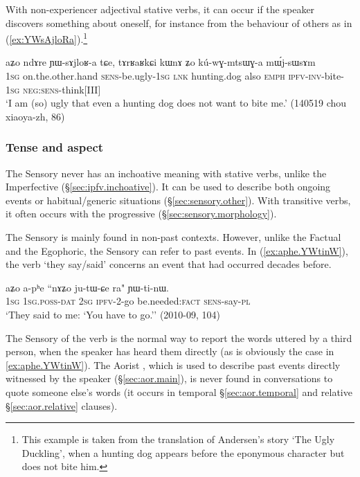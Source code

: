 With non-experiencer adjectival stative verbs, it can occur if the speaker discovers something about oneself, for instance from the behaviour of others as in (\ref{ex:YWsAjloRa}).\footnote{This example is taken from the translation of Andersen's story `The Ugly Duckling', when a hunting dog appears before the eponymous character but does not bite him. }

\begin{exe}
\ex \label{ex:YWsAjloRa}
\gll  aʑo ndɤre ɲɯ-sɤjloʁ-a tɕe, tɤrʁaʁkɕi kɯnɤ ʑo kú-wɣ-mtsɯɣ-a mɯ́j-sɯsɤm \\
\textsc{1sg} on.the.other.hand \textsc{sens}-be.ugly-\textsc{1sg} \textsc{lnk} hunting.dog also \textsc{emph} \textsc{ipfv}-\textsc{inv}-bite-\textsc{1sg} \textsc{neg}:\textsc{sens}-think[III] \\
\glt `I am (so) ugly that even a hunting dog does not want to bite me.'  (140519 chou xiaoya-zh, 86)
\end{exe}

 
\subsubsection{Tense and aspect} \label{sec:sensory.functions}
The Sensory never has an inchoative meaning with stative verbs, unlike the Imperfective (§\ref{sec:ipfv.inchoative}). It can be used to describe both ongoing events or habitual/generic situations (§\ref{sec:sensory.other}).
With transitive verbs, it often occurs with the progressive (§\ref{sec:sensory.morphology}). 

The Sensory is mainly found in non-past contexts. However, unlike the Factual and the Egophoric, the Sensory can refer to past events. In (\ref{ex:aphe.YWtinW}), the verb  `they say/said' concerns an event that had occurred decades before.

\begin{exe}
\ex \label{ex:aphe.YWtinW}
\gll  aʑo a-pʰe ``nɤʑo ju-tɯ-ɕe ra" ɲɯ-ti-nɯ. \\
\textsc{1sg} \textsc{1sg}.\textsc{poss}-\textsc{dat} \textsc{2sg} \textsc{ipfv}-2-go be.needed:\textsc{fact} \textsc{sens}-say-\textsc{pl} \\
\glt  `They said to me: `You have to go.'' (2010-09, 104)
\end{exe}

The Sensory  of the verb  is the normal way to report the words uttered by a third person, when the speaker has heard them directly (as is obviously the case in \ref{ex:aphe.YWtinW}). The Aorist , which is used to describe past events directly witnessed by the speaker (§\ref{sec:aor.main}), is never found in conversations to quote someone else's words (it occurs in temporal §\ref{sec:aor.temporal} and relative §\ref{sec:aor.relative} clauses).

